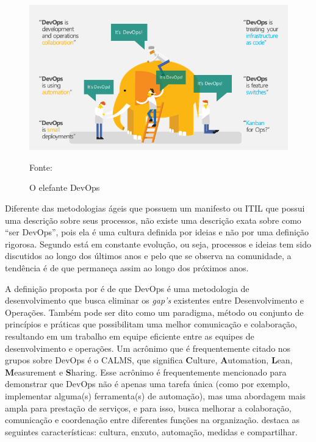 \documentclass[twoside,english,brazilian]{UNISINOSartigo}
\newcommand{\source}[1]{\caption*{Fonte: {#1}} }
\begin{document}
\begin{figure}[h!]
    \centering
        \caption{O elefante DevOps}
    \includegraphics[scale=.5]{imagens/devops_elephant.png}
    \source{}
    \label{fig:elefante DevOps}
\end{figure}

Diferente das metodologias ágeis que possuem um manifesto ou ITIL que possui uma descrição sobre seus processos, não existe uma descrição exata sobre como ``ser DevOps'', pois ela é uma cultura definida por ideias e não por uma definição rigorosa. Segundo  está em constante evolução, ou seja, processos e ideias tem sido discutidos ao longo dos últimos anos e pelo que se observa na comunidade, a tendência é de que permaneça assim ao longo dos próximos anos. 

A definição proposta por  é de que DevOps é uma metodologia de desenvolvimento que busca eliminar os \textit{gap's} existentes entre Desenvolvimento e Operações. Também pode ser dito como um paradigma, método ou conjunto de princípios e práticas que possibilitam uma melhor comunicação e colaboração, resultando em um trabalho em equipe eficiente entre as equipes de desenvolvimento e operações.
Um acrônimo que é frequentemente citado nos grupos sobre DevOps é o CALMS, que significa \textbf{C}ulture, \textbf{A}utomation, \textbf{L}ean, \textbf{M}easurement e \textbf{S}haring. Esse acrônimo é frequentemente mencionado para demonstrar que DevOps não é apenas uma tarefa única (como por exemplo, implementar alguma(s) ferramenta(s) de automação), mas uma abordagem mais ampla para prestação de serviços, e para isso, busca melhorar a colaboração, comunicação  e coordenação entre diferentes funções na organização.  destaca as seguintes características: cultura, enxuto, automação, medidas e compartilhar.
\end{document}
